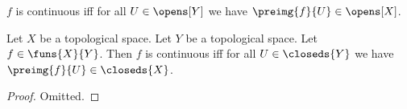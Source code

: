 




\begin{definition}\label{continuous}
    $f$ is continuous iff for all $U \in \opens[Y]$ we have $\preimg{f}{U} \in \opens[X]$.
\end{definition}

\begin{proposition}\label{continuous_definition_by_closeds}
    Let $X$ be a topological space.
    Let $Y$ be a topological space.
    Let $f \in \funs{X}{Y}$.
    Then $f$ is continuous iff for all $U \in \closeds{Y}$ we have $\preimg{f}{U} \in \closeds{X}$.
\end{proposition}
\begin{proof}
    Omitted.
\end{proof}


